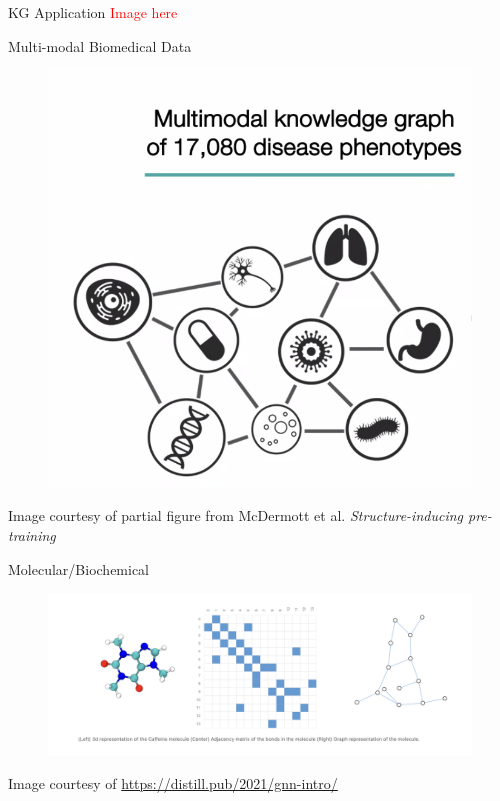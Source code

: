 \documentclass{beamer}
\begin{document}
\begin{frame}{KG Application}
    \textcolor{red}{Image here}
\end{frame}

\begin{frame}{Multi-modal Biomedical Data}
    \begin{figure}
        \centering 
        \includegraphics[scale=0.2]{MultimodalPreview.png}
    \end{figure}
    Image courtesy of partial figure from McDermott et al. {\it Structure-inducing pre-training} \cite{mcdermott_structure-inducing_2023}
\end{frame}


\begin{frame}{Molecular/Biochemical}
    \begin{figure}
        \centering
        \includegraphics[scale=0.3]{Caffeine_Graph.png}
    \end{figure}
    Image courtesy of \url{https://distill.pub/2021/gnn-intro/} \cite{sanchez-lengeling_gentle_2021}
\end{frame}
\end{document}
